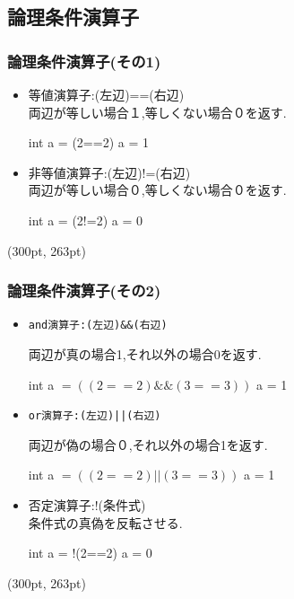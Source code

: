 \documentclass[dvipdfmx]{beamer}
\begin{document}
\subsection{論理条件演算子}
\begin{frame}[c, fragile]
    \frametitle{論理条件演算子(その1)}
    \begin{itemize}
        \item 等値演算子:(左辺)==(右辺)\\
            \qquad 両辺が等しい場合１,等しくない場合０を返す.
            \begin{block}{int a = (2==2)}
                a = 1
            \end{block}
        \item 非等値演算子:(左辺)!=(右辺)\\
            \qquad 両辺が等しい場合０,等しくない場合０を返す.
            \begin{block}{int a = (2!=2)}
                a = 0
            \end{block}
    \end{itemize}
    \begin{textblock*}{0.3\linewidth}(300pt, 263pt)
    \space
    \end{textblock*}
\end{frame}

\begin{frame}[c, fragile]
    \frametitle{論理条件演算子(その2)}
    \begin{itemize}
        \item \begin{verbatim}and演算子:(左辺)&&(右辺)\end{verbatim}
            \qquad 両辺が真の場合1,それ以外の場合0を返す.
            \begin{block}{int a $= ((2==2)\&\& (3==3))$}
                a = 1
            \end{block}
        \item \begin{verbatim}or演算子:(左辺)||(右辺)\end{verbatim}
            \qquad 両辺が偽の場合０,それ以外の場合1を返す.
            \begin{block}{int a $= ((2==2) \lvert\rvert  (3==3))$}
                a = 1
            \end{block}
        \item 否定演算子:!(条件式)\\
            \qquad 条件式の真偽を反転させる.
            \begin{block}{int a = !(2==2)}
                    a = 0
            \end{block}
    \end{itemize}
    \begin{textblock*}{0.3\linewidth}(300pt, 263pt)
    \space
    \end{textblock*}
\end{frame}
\end{document}
